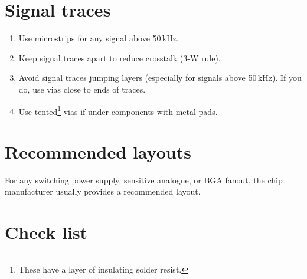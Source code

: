 \section{Signal traces}

\begin{enumerate}
  
\item
  Use microstrips for any signal above 50\,kHz.

\item
  Keep signal traces apart to reduce crosstalk (3-W rule).

\item
  Avoid signal traces jumping layers (especially for signals above
  50\,kHz).  If you do, use vias close to ends of traces.

\item
  Use tented\footnote{These have a layer of insulating solder resist.}
  vias if under components with metal pads.
  
\end{enumerate}


\section{Recommended layouts}

For any switching power supply, sensitive analogue, or BGA fanout, the
chip manufacturer usually provides a recommended layout.

\section{Check list}
\label{PCB-check-list}

